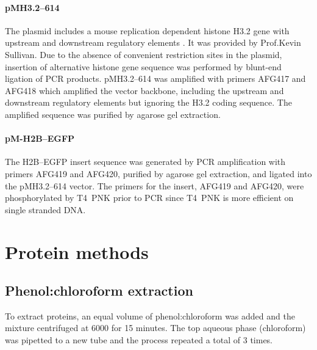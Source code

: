       \paragraph{pMH3.2--614}
      The plasmid includes a mouse replication dependent histone H3.2
      gene with upstream and downstream regulatory elements
      \citep{pMH3-plasmid}.  It was provided by Prof.\@ Kevin
      Sullivan.  Due to the absence of convenient restriction sites in
      the plasmid, insertion of alternative histone gene sequence was
      performed by blunt-end ligation of PCR products.  pMH3.2--614
      was amplified with primers AFG417 and AFG418 which amplified the
      vector backbone, including the upstream and downstream
      regulatory elements but ignoring the H3.2 coding sequence.  The
      amplified sequence was purified by agarose gel extraction.

      \paragraph{pM-H2B--EGFP}
      The H2B--EGFP insert sequence was generated by PCR amplification
      with primers AFG419 and AFG420, purified by agarose gel
      extraction, and ligated into the pMH3.2--614 vector.  The
      primers for the insert, AFG419 and AFG420, were phosphorylated
      by T4~PNK prior to PCR since T4~PNK is more efficient on single
      stranded DNA.

  \section{Protein methods}
    \subsection{Phenol:chloroform extraction}
      \label{sec:phenol-extraction}
      To extract proteins, an equal volume of phenol:chloroform was
      added and the mixture centrifuged at \SI{6000}{\gn} for 15 minutes.
      The top aqueous phase (chloroform) was pipetted to a new tube and
      the process repeated a total of 3 times.

